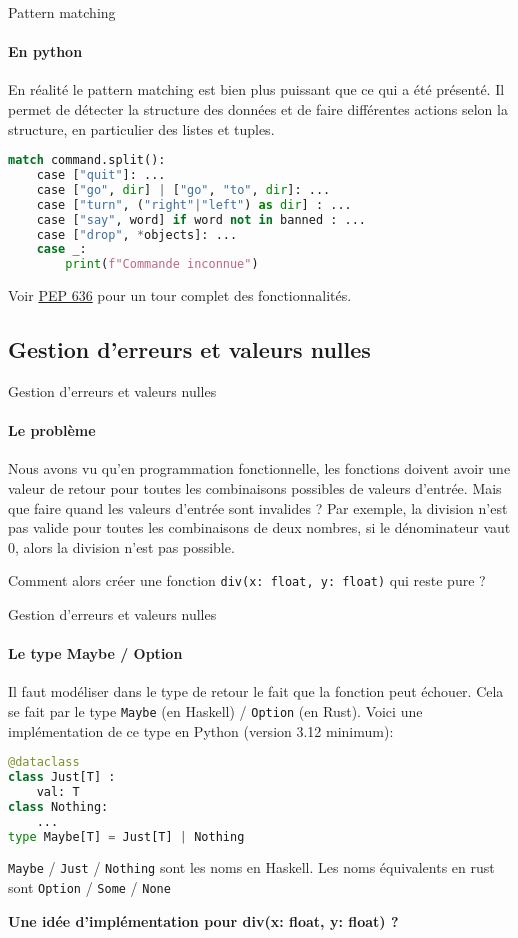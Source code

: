 \documentclass[aspectratio=169]{beamer}
\begin{document}
\begin{frame}[fragile]{Pattern matching}
    \framesubtitle{En python}

    En réalité le pattern matching est bien plus puissant que ce qui a été présenté. Il permet de détecter la structure des données et de faire différentes actions selon la structure, en particulier des listes et tuples.

    \begin{lstlisting}[language=Python]
match command.split():
    case ["quit"]: ... 
    case ["go", dir] | ["go", "to", dir]: ...
    case ["turn", ("right"|"left") as dir] : ...
    case ["say", word] if word not in banned : ...
    case ["drop", *objects]: ...
    case _:
        print(f"Commande inconnue")
    \end{lstlisting}

    Voir \href{https://peps.python.org/pep-0636/}{PEP 636} pour un tour complet des fonctionnalités.
\end{frame}

\subsection{Gestion d'erreurs et valeurs nulles}

\begin{frame}[fragile]{Gestion d'erreurs et valeurs nulles}
    \framesubtitle{Le problème}
    Nous avons vu qu'en programmation fonctionnelle, les fonctions doivent avoir une valeur de retour pour toutes les combinaisons possibles de valeurs d'entrée. Mais que faire quand les valeurs d'entrée sont invalides ?
    Par exemple, la division n'est pas valide pour toutes les combinaisons de deux nombres, si le dénominateur vaut 0, alors la division n'est pas possible.

    Comment alors créer une fonction \verb|div(x: float, y: float)| qui reste pure ?
\end{frame}

\begin{frame}[fragile]{Gestion d'erreurs et valeurs nulles}
    \framesubtitle{Le type Maybe / Option}
    Il faut modéliser dans le type de retour le fait que la fonction peut échouer. Cela se fait par le type \verb|Maybe| (en Haskell) / \verb|Option| (en Rust).
    Voici une implémentation de ce type en Python (version 3.12 minimum):
    \begin{lstlisting}[language=Python]
@dataclass
class Just[T] :
    val: T
class Nothing:
    ...
type Maybe[T] = Just[T] | Nothing
    \end{lstlisting}

    \verb|Maybe| / \verb|Just| / \verb|Nothing| sont les noms en Haskell. Les noms équivalents en rust sont \verb|Option| / \verb|Some| / \verb|None|

    \textbf{Une idée d'implémentation pour div(x: float, y: float) ?}
\end{frame}
\end{document}
